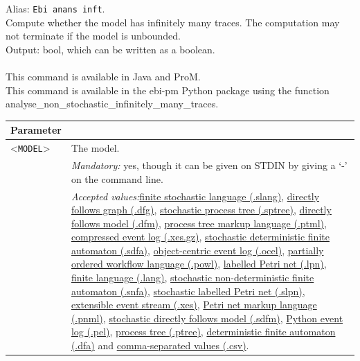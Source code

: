 {Alias: \texttt{Ebi anans inft}.\\
Compute whether the model has infinitely many traces. The computation may not terminate if the model is unbounded.\\
\noindent Output: bool, which can be written as a boolean.\\
\\This command is available in Java and ProM.
\\This command is available in the ebi-pm Python package using the function analyse\_non\_stochastic\_infinitely\_many\_traces.
\begin{tabularx}{\linewidth}{lX}
\toprule
Parameter \\\midrule
<\texttt{MODEL}>&The model.\\
&\textit{Mandatory:} \quad yes, though it can be given on STDIN by giving a `-' on the command line.\\
&\textit{Accepted values:}\quad \hyperref[filehandler:finite stochastic language]{finite stochastic language (.slang)}, \hyperref[filehandler:directly follows graph]{directly follows graph (.dfg)}, \hyperref[filehandler:stochastic process tree]{stochastic process tree (.sptree)}, \hyperref[filehandler:directly follows model]{directly follows model (.dfm)}, \hyperref[filehandler:process tree markup language]{process tree markup language (.ptml)}, \hyperref[filehandler:compressed event log]{compressed event log (.xes.gz)}, \hyperref[filehandler:stochastic deterministic finite automaton]{stochastic deterministic finite automaton (.sdfa)}, \hyperref[filehandler:object-centric event log]{object-centric event log (.ocel)}, \hyperref[filehandler:partially ordered workflow language]{partially ordered workflow language (.powl)}, \hyperref[filehandler:labelled Petri net]{labelled Petri net (.lpn)}, \hyperref[filehandler:finite language]{finite language (.lang)}, \hyperref[filehandler:stochastic non-deterministic finite automaton]{stochastic non-deterministic finite automaton (.snfa)}, \hyperref[filehandler:stochastic labelled Petri net]{stochastic labelled Petri net (.slpn)}, \hyperref[filehandler:extensible event stream]{extensible event stream (.xes)}, \hyperref[filehandler:Petri net markup language]{Petri net markup language (.pnml)}, \hyperref[filehandler:stochastic directly follows model]{stochastic directly follows model (.sdfm)}, \hyperref[filehandler:Python event log]{Python event log (.pel)}, \hyperref[filehandler:process tree]{process tree (.ptree)}, \hyperref[filehandler:deterministic finite automaton]{deterministic finite automaton (.dfa)} and \hyperref[filehandler:comma-separated values]{comma-separated values (.csv)}.\\

\end{tabularx}}
